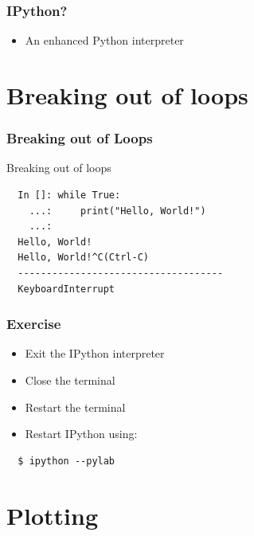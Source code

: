 \documentclass[14pt,compress]{beamer}
\begin{document}
\begin{frame}[fragile]
  \frametitle{IPython? }
  \begin{itemize}
  \item An enhanced Python interpreter
  \end{itemize}
\end{frame}



\section{Breaking out of loops}
\begin{frame}[fragile]
\frametitle{Breaking out of Loops}
Breaking out of loops
\begin{lstlisting}
  In []: while True:
    ...:     print("Hello, World!")
    ...:
  Hello, World!
  Hello, World!^C(Ctrl-C)
  ------------------------------------
  KeyboardInterrupt
\end{lstlisting}
\end{frame}

\begin{frame}[fragile]
  \frametitle{Exercise}

  \begin{itemize}
  \item Exit the IPython interpreter
  \item Close the terminal
  \item Restart the terminal
  \item Restart IPython using:
  \end{itemize}
\begin{lstlisting}
  $ ipython --pylab
\end{lstlisting} %
\end{frame}

\section{Plotting}
\end{document}
